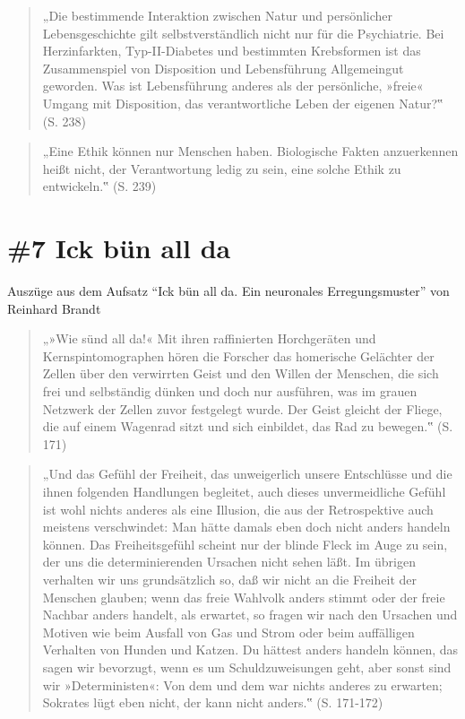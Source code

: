 \documentclass[
  a4paper,
]{report}
\begin{document}
\begin{quote}
„Die bestimmende Interaktion zwischen Natur und persönlicher Lebensgeschichte gilt selbstverständlich nicht nur für die Psychiatrie. Bei Herzinfarkten, Typ-II-Diabetes und bestimmten Krebsformen ist das Zusammenspiel von Disposition und Lebensführung Allgemeingut geworden. Was ist Lebensführung anderes als der persönliche, »freie« Umgang mit Disposition, das verantwortliche Leben der eigenen Natur?‟ (S. 238)
\end{quote}

\begin{quote}
„Eine Ethik können nur Menschen haben. Biologische Fakten anzuerkennen heißt nicht, der Verantwortung ledig zu sein, eine solche Ethik zu entwickeln.‟ (S. 239)
\end{quote}

\hypertarget{def-ev7}{%
\section{\#7 Ick bün all da}\label{def-ev7}}

Auszüge aus dem Aufsatz ``Ick bün all da. Ein neuronales Erregungsmuster'' von Reinhard Brandt \citeyearpar{Brandt2004}

\begin{quote}
„»Wie sünd all da!« Mit ihren raffinierten Horchgeräten und Kernspintomographen hören die Forscher das homerische Gelächter der Zellen über den verwirrten Geist und den Willen der Menschen, die sich frei und selbständig dünken und doch nur ausführen, was im grauen Netzwerk der Zellen zuvor festgelegt wurde. Der Geist gleicht der Fliege, die auf einem Wagenrad sitzt und sich einbildet, das Rad zu bewegen.‟ (S. 171)
\end{quote}

\begin{quote}
„Und das Gefühl der Freiheit, das unweigerlich unsere Entschlüsse und die ihnen folgenden Handlungen begleitet, auch dieses unvermeidliche Gefühl ist wohl nichts anderes als eine Illusion, die aus der Retrospektive auch meistens verschwindet: Man hätte damals eben doch nicht anders handeln können. Das Freiheitsgefühl scheint nur der blinde Fleck im Auge zu sein, der uns die determinierenden Ursachen nicht sehen läßt. Im übrigen verhalten wir uns grundsätzlich so, daß wir nicht an die Freiheit der Menschen glauben; wenn das freie Wahlvolk anders stimmt oder der freie Nachbar anders handelt, als erwartet, so fragen wir nach den Ursachen und Motiven wie beim Ausfall von Gas und Strom oder beim auffälligen Verhalten von Hunden und Katzen. Du hättest anders handeln können, das sagen wir bevorzugt, wenn es um Schuldzuweisungen geht, aber sonst sind wir »Deterministen«: Von dem und dem war nichts anderes zu erwarten; Sokrates lügt eben nicht, der kann nicht anders.‟ (S. 171-172)
\end{quote}
\end{document}
